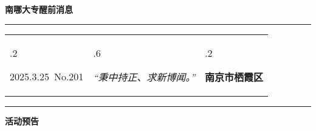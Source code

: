 \documentclass[letterpaper, 12pt]{article}
\begin{document}
\begin{center}
    \Huge\textbf{南哪大专醒前消息}
\end{center}
\vspace{4mm}
\hrule
\renewcommand\tabularxcolumn[1]{m{#1}}
\begin{tabularx}{\textwidth}{>{\hsize.2\hsize}X>{\hsize.6\hsize}X>{\hsize.2\hsize}X}
    \begin{flushleft}
        2025.3.25\, No.201
    \end{flushleft}
    &
    \begin{center}
        \textit{“秉中持正、求新博闻。”}
    \end{center}
    &
    \begin{flushright}
        \textbf{南京市栖霞区}
    \end{flushright}
\end{tabularx}
\vspace{-3.5mm}
\hrule
\vspace{4mm}
\centerline{\huge\textbf{活动预告}}
\end{document}
